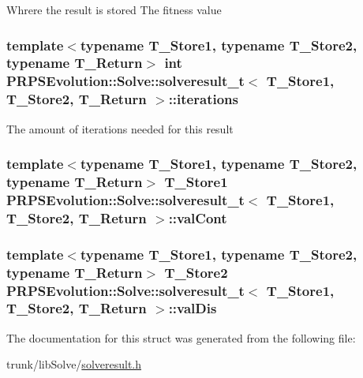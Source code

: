 \-Whrere the result is stored \-The fitness value \hypertarget{struct_p_r_p_s_evolution_1_1_solve_1_1solveresult__t_a6c8ef0cf18e264949a2160e486a36ebb}{
\subsubsection[{iterations}]{\setlength{\rightskip}{0pt plus 5cm}template$<$typename \-T\-\_\-\-Store1, typename \-T\-\_\-\-Store2, typename \-T\-\_\-\-Return$>$ int {\bf \-P\-R\-P\-S\-Evolution\-::\-Solve\-::solveresult\-\_\-t}$<$ \-T\-\_\-\-Store1, \-T\-\_\-\-Store2, \-T\-\_\-\-Return $>$\-::{\bf iterations}}}\label{struct_p_r_p_s_evolution_1_1_solve_1_1solveresult__t_a6c8ef0cf18e264949a2160e486a36ebb}
\-The amount of iterations needed for this result \hypertarget{struct_p_r_p_s_evolution_1_1_solve_1_1solveresult__t_a9a49bd614802e9e690f9705792991f9d}{
\subsubsection[{val\-Cont}]{\setlength{\rightskip}{0pt plus 5cm}template$<$typename \-T\-\_\-\-Store1, typename \-T\-\_\-\-Store2, typename \-T\-\_\-\-Return$>$ \-T\-\_\-\-Store1 {\bf \-P\-R\-P\-S\-Evolution\-::\-Solve\-::solveresult\-\_\-t}$<$ \-T\-\_\-\-Store1, \-T\-\_\-\-Store2, \-T\-\_\-\-Return $>$\-::{\bf val\-Cont}}}\label{struct_p_r_p_s_evolution_1_1_solve_1_1solveresult__t_a9a49bd614802e9e690f9705792991f9d}
\hypertarget{struct_p_r_p_s_evolution_1_1_solve_1_1solveresult__t_ad7bff6e85f584c6a6af9801ffbc8eba2}{
\subsubsection[{val\-Dis}]{\setlength{\rightskip}{0pt plus 5cm}template$<$typename \-T\-\_\-\-Store1, typename \-T\-\_\-\-Store2, typename \-T\-\_\-\-Return$>$ \-T\-\_\-\-Store2 {\bf \-P\-R\-P\-S\-Evolution\-::\-Solve\-::solveresult\-\_\-t}$<$ \-T\-\_\-\-Store1, \-T\-\_\-\-Store2, \-T\-\_\-\-Return $>$\-::{\bf val\-Dis}}}\label{struct_p_r_p_s_evolution_1_1_solve_1_1solveresult__t_ad7bff6e85f584c6a6af9801ffbc8eba2}


\-The documentation for this struct was generated from the following file\-:\begin{DoxyCompactItemize}
\item 
trunk/lib\-Solve/\hyperlink{solveresult_8h}{solveresult.\-h}\end{DoxyCompactItemize}
